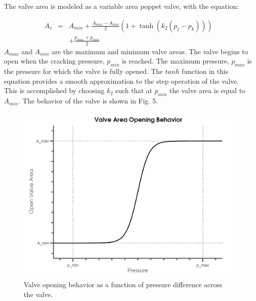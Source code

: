 \documentclass[twocolumn,10pt]{asme2e}
\begin{document}
The valve area is modeled as a variable area poppet valve, with the equation:  

\begin{eqnarray}
A_v &=& A_{min}+\frac{A_{max}-A_{min}}{2}(1+\tanh(k_2(p_j-p_k)))\nonumber\\
&& +\frac{p_{max}+p_{min}}{2}
\end{eqnarray}
%
$A_{max}$ and $A_{min}$ are the maximum and minimum valve areas. The valve begins to open when the cracking pressure, $p_{min}$ is reached. The maximum pressure, $p_{max}$ is the pressure for which the valve is fully opened.  The $tanh$ function in this equation provides a smooth approximation to the step operation of the 
valve. This is accomplished by choosing $k_2$ such that at $p_{min}$ the valve area is equal to $A_{min}$. The behavior of the valve is shown in Fig. 5. 

\begin{figure}[t]
    \centering
    \includegraphics[width=1\columnwidth]{Images/ValveBehavior}
    \caption{Valve opening behavior as a function of pressure difference across the valve.}
    \end{figure}    
\end{document}
